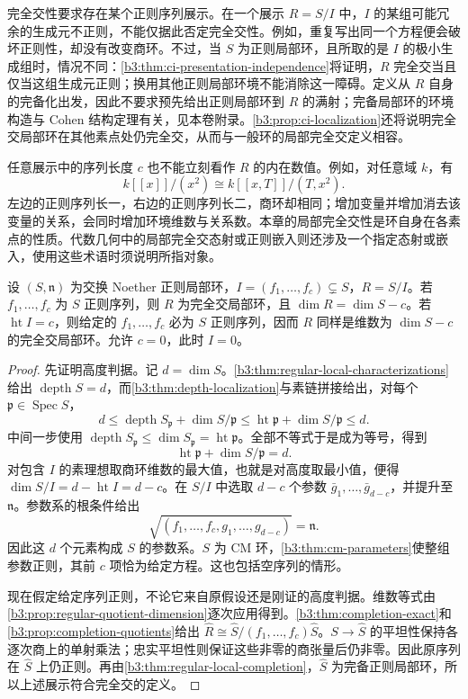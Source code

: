 完全交性要求存在某个正则序列展示。在一个展示 \(R=S/I\) 中，\(I\) 的某组可能冗余的生成元不正则，不能仅据此否定完全交性。例如，重复写出同一个方程便会破坏正则性，却没有改变商环。不过，当 \(S\) 为正则局部环，且所取的是 \(I\) 的极小生成组时，情况不同：\cref{b3:thm:ci-presentation-independence}将证明，\(R\) 完全交当且仅当这组生成元正则；换用其他正则局部环境不能消除这一障碍。定义从 \(R\) 自身的完备化出发，因此不要求预先给出正则局部环到 \(R\) 的满射；完备局部环的环境构造与 Cohen 结构定理有关，见本卷附录。\cref{b3:prop:ci-localization}还将说明完全交局部环在其他素点处仍完全交，从而与一般环的局部完全交定义相容。

\ProseParagraphBreak
任意展示中的序列长度 \(c\) 也不能立刻看作 \(R\) 的内在数值。例如，对任意域 \(k\)，有
\[
	k[\![x]\!]/(x^2)\cong k[\![x,T]\!]/(T,x^2).
\]
左边的正则序列长一，右边的正则序列长二，商环却相同；增加变量并增加消去该变量的关系，会同时增加环境维数与关系数。本章的局部完全交性是环自身在各素点的性质。代数几何中的局部完全交态射或正则嵌入则还涉及一个指定态射或嵌入，使用这些术语时须说明所指对象。

\begin{proposition}\label{b3:prop:given-complete-intersection}
	设 \((S,\mathfrak n)\) 为交换 Noether 正则局部环，\(I=(f_1,\ldots,f_c)\subsetneq S\)，\(R=S/I\)。若 \(f_1,\ldots,f_c\) 为 \(S\) 正则序列，则 \(R\) 为完全交局部环，且 \(\dim R=\dim S-c\)。若 \(\operatorname{ht}I=c\)，则给定的 \(f_1,\ldots,f_c\) 必为 \(S\) 正则序列，因而 \(R\) 同样是维数为 \(\dim S-c\) 的完全交局部环。允许 \(c=0\)，此时 \(I=0\)。
\end{proposition}
\begin{proof}
	先证明高度判据。记 \(d=\dim S\)。\cref{b3:thm:regular-local-characterizations}给出 \(\operatorname{depth}S=d\)，而\cref{b3:thm:depth-localization}与素链拼接给出，对每个 \(\mathfrak p\in\operatorname{Spec}S\)，
	\[
		d\le\operatorname{depth}S_{\mathfrak p}+\dim S/\mathfrak p \le\operatorname{ht}\mathfrak p+\dim S/\mathfrak p\le d.
	\]
	中间一步使用 \(\operatorname{depth}S_{\mathfrak p}\le\dim S_{\mathfrak p}=\operatorname{ht}\mathfrak p\)。全部不等式于是成为等号，得到
	\[
		\operatorname{ht}\mathfrak p+\dim S/\mathfrak p=d.
	\]
	对包含 \(I\) 的素理想取商环维数的最大值，也就是对高度取最小值，便得 \(\dim S/I=d-\operatorname{ht}I=d-c\)。在 \(S/I\) 中选取 \(d-c\) 个参数 \(\bar g_1,\ldots,\bar g_{d-c}\)，并提升至 \(\mathfrak n\)。参数系的根条件给出
	\[
		\sqrt{(f_1,\ldots,f_c,g_1,\ldots,g_{d-c})}=\mathfrak n.
	\]
	因此这 \(d\) 个元素构成 \(S\) 的参数系。\(S\) 为 CM 环，\cref{b3:thm:cm-parameters}使整组参数正则，其前 \(c\) 项恰为给定方程。这也包括空序列的情形。

	现在假定给定序列正则，不论它来自原假设还是刚证的高度判据。维数等式由\cref{b3:prop:regular-quotient-dimension}逐次应用得到。\cref{b3:thm:completion-exact}和\cref{b3:prop:completion-quotients}给出 \(\widehat R\cong\widehat S/(f_1,\ldots,f_c)\widehat S\)。\(S\to\widehat S\) 的平坦性保持各逐次商上的单射乘法；忠实平坦性则保证这些非零的商张量后仍非零。因此原序列在 \(\widehat S\) 上仍正则。再由\cref{b3:thm:regular-local-completion}，\(\widehat S\) 为完备正则局部环，所以上述展示符合完全交的定义。
\end{proof}

